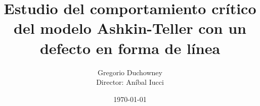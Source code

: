 \title{Estudio del comportamiento crítico del modelo Ashkin-Teller con un defecto en forma de línea}
\author{Gregorio Duchowney\\[0.5 em]Director: Aníbal Iucci}
\date{\today}

\maketitle
